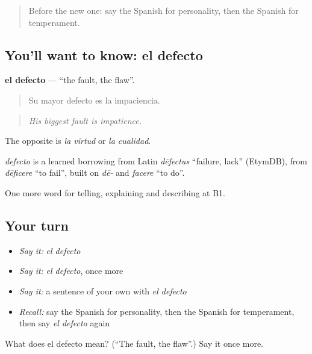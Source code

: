 \begin{quote}
Before the new one: say the Spanish for personality, then the Spanish for temperament.
\end{quote}

\subsection*{You'll want to know: el defecto}
\textbf{el defecto} — \textquotedblleft{}the fault, the flaw\textquotedblright{}.

\begin{quote}
Su mayor defecto es la impaciencia.
\end{quote}

\begin{quote}
\emph{His biggest fault is impatience.}
\end{quote}

The opposite is \emph{la virtud} or \emph{la cualidad}.

\begin{cousinweb}
\emph{defecto} is a learned borrowing from Latin \emph{dēfectus} \textquotedblleft{}failure, lack\textquotedblright{} (EtymDB), from \emph{dēficere} \textquotedblleft{}to fail\textquotedblright{}, built on \emph{dē-} and \emph{facere} \textquotedblleft{}to do\textquotedblright{}.
\end{cousinweb}

\begin{grammarlens}[title={What you've built}]
One more word for telling, explaining and describing at B1.
\end{grammarlens}

\subsection*{Your turn}
\begin{itemize}
\raggedright
  \item \emph{Say it:} \emph{el defecto}
  \item \emph{Say it:} \emph{el defecto}, once more
  \item \emph{Say it:} a sentence of your own with \emph{el defecto}
  \item \emph{Recall:} say the Spanish for personality, then the Spanish for temperament, then say \emph{el defecto} again
\end{itemize}

\begin{tcolorbox}[breakable,colback=teal!4,colframe=teal!35!black,title={Before you move on}]
What does el defecto mean? (\textquotedblleft{}The fault, the flaw\textquotedblright{}.) Say it once more.
\end{tcolorbox}
